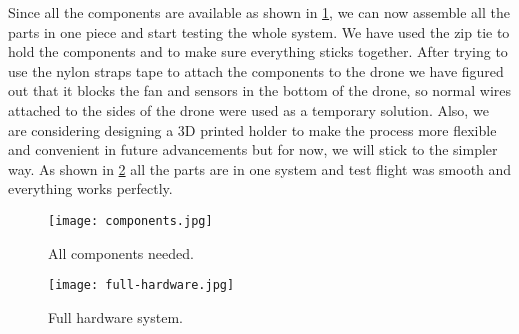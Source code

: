 \documentclass[../main.tex]{subfiles}
\begin{document}
Since all the components are available as shown 
in \cref{fig:components}, we can now assemble 
all the parts in one piece and start testing the whole system.
We have used the zip tie to hold the components and to
make sure everything sticks together. After trying to use the 
nylon straps tape to attach the components to the drone 
we have figured out that it blocks the fan 
and sensors in the bottom of the drone, 
so normal wires attached to the sides of the drone were 
used as a temporary solution. Also, we are considering 
designing a 3D printed holder to make the process more 
flexible and convenient in future advancements but for now,
we will stick to the simpler way. As shown in 
\cref{fig:full-hardware} all the parts are in one system 
and test flight was smooth and everything works perfectly. 

 \begin{figure}[p]
	\centering
	\texttt{[image: components.jpg]}
	\caption{All components needed.}
	\label{fig:components}
\end{figure}

  \begin{figure}[p]
 	\centering
 	\texttt{[image: full-hardware.jpg]}
 	\caption{Full hardware system.}
 	\label{fig:full-hardware}
 \end{figure}  
\end{document}
